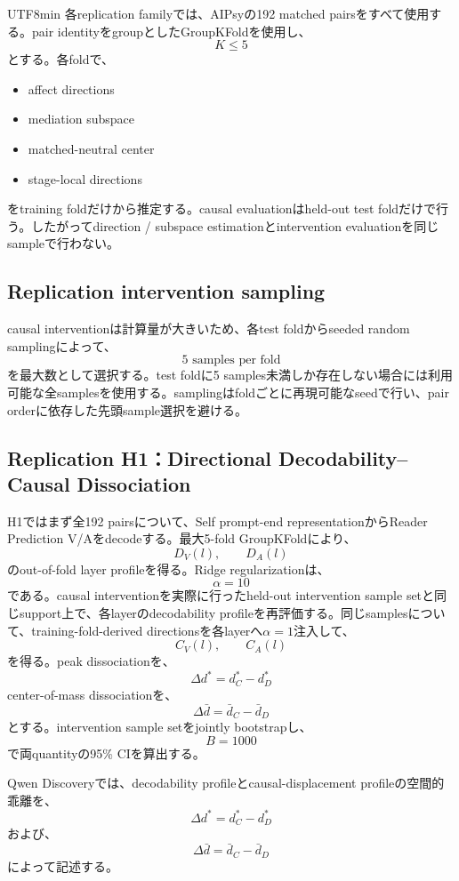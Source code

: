 \documentclass{article} %
\begin{document}
\begin{CJK*}{UTF8}{min}
各replication familyでは、AIPsyの192 matched pairsをすべて使用する。pair identityをgroupとしたGroupKFoldを使用し、
\[
K\le5
\]
とする。各foldで、
\begin{itemize}
    \item affect directions
    \item mediation subspace
    \item matched-neutral center
    \item stage-local directions
\end{itemize}
をtraining foldだけから推定する。causal evaluationはheld-out test foldだけで行う。したがってdirection / subspace estimationとintervention evaluationを同じsampleで行わない。


\subsection{Replication intervention sampling}

causal interventionは計算量が大きいため、各test foldからseeded random samplingによって、
\[
5\text{ samples per fold}
\]
を最大数として選択する。test foldに5 samples未満しか存在しない場合には利用可能な全samplesを使用する。samplingはfoldごとに再現可能なseedで行い、pair orderに依存した先頭sample選択を避ける。


\subsection{Replication H1：Directional Decodability--Causal Dissociation}
H1ではまず全192 pairsについて、Self prompt-end representationからReader Prediction V/Aをdecodeする。最大5-fold GroupKFoldにより、
\[
D_V(l),
\qquad
D_A(l)
\]
のout-of-fold layer profileを得る。Ridge regularizationは、
\[
\alpha=10
\]
である。causal interventionを実際に行ったheld-out intervention sample setと同じsupport上で、各layerのdecodability profileを再評価する。同じsamplesについて、training-fold-derived directionsを各layerへ\(\alpha=1\)注入して、
\[
C_V(l),
\qquad
C_A(l)
\]
を得る。peak dissociationを、
\[
\Delta d^{*}
=
d_C^{*}-d_D^{*}
\]
center-of-mass dissociationを、
\[
\Delta\bar d
=
\bar d_C-\bar d_D
\]
とする。intervention sample setをjointly bootstrapし、
\[
B=1000
\]
で両quantityの95\% CIを算出する。

Qwen Discoveryでは、decodability profileとcausal-displacement profileの空間的乖離を、
\[
\Delta d^{*}
=
d_C^{*}-d_D^{*}
\]
および、
\[
\Delta\bar d
=
\bar d_C-\bar d_D
\]
によって記述する。


\end{CJK*}
\end{document}

